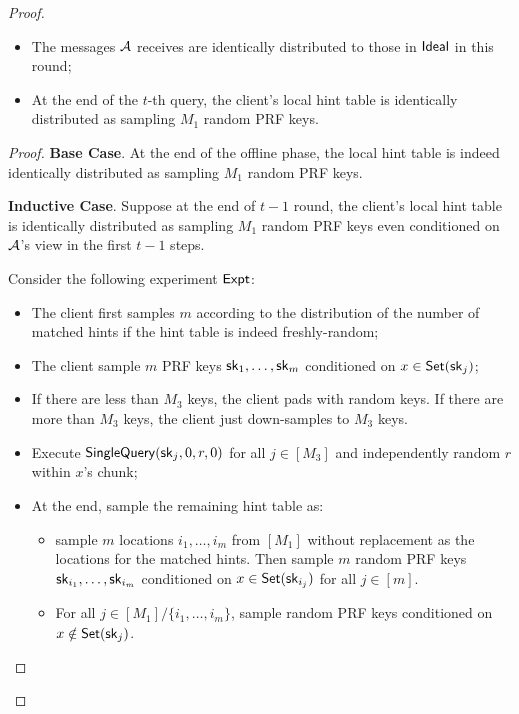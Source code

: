 \begin{proof}
\begin{lemma}
        \begin{itemize}
            \item The messages $\mathcal{A}$ receives are identically distributed to those in ${\sf Ideal}$ in this round;
            \item At the end of the $t$-th query, the client's local hint table  is identically distributed as sampling $M_1$ random PRF keys.
        \end{itemize}
    \end{lemma}
    
    \begin{proof}
        \textbf{Base Case}. At the end of the offline phase, the local hint table is indeed identically distributed as sampling $M_1$ random PRF keys.
        
        \textbf{Inductive Case}. Suppose at the end of $t-1$ round, the client's local hint table is identically distributed as sampling $M_1$ random PRF keys even conditioned on $\mathcal{A}$'s view in the first $t-1$ steps.
        
        Consider the following experiment ${\sf Expt}$:
        \begin{itemize}
            \item The client first samples $m$ according to the distribution of the number of matched hints if the hint table is indeed freshly-random;
            \item The client sample $m$ PRF keys $\mathsf{sk}_1,\dots,\mathsf{sk}_m$ conditioned on $x\in \mathsf{Set}(\mathsf{sk}_j)$;
            \item If there are less than $M_3$ keys, the client pads with random keys. If there are more than $M_3$ keys, the client just down-samples to $M_3$ keys.
            \item Execute $\mathsf{SingleQuery}(\mathsf{sk}_j, 0, r, 0)$ for all $j\in[M_3]$ and independently random $r$ within $x$'s chunk;
            
            \item At the end, sample the remaining hint table as:
            \begin{itemize}
                \item sample $m$ locations $i_1,\dots,i_m$ from $[M_1]$ without replacement as the locations for the matched hints. Then sample $m$ random PRF keys $\mathsf{sk}_{i_1},\dots,\mathsf{sk}_{i_m}$ conditioned on $x\in \mathsf{Set}(\mathsf{sk}_{i_j})$ for all $j\in[m]$.
                \item For all $j\in[M_1]/\{i_1,\dots,i_m\}$, sample random PRF keys conditioned on $x\notin \mathsf{Set}(\mathsf{sk}_j)$.
            \end{itemize}
        \end{itemize}
        

\end{proof}
\end{proof}
